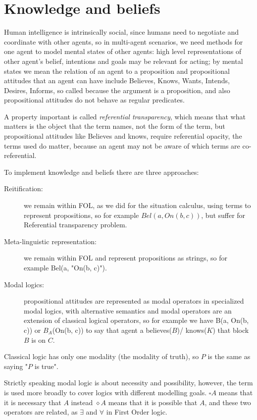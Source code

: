 \section{Knowledge and beliefs}
Human intelligence is intrinsically social, since humans need to negotiate and
coordinate with other agents, so in multi-agent scenarios, we need methods for
one agent to model mental states of other agents: high level representations of
other agent’s belief, intentions and goals may be relevant for acting;
by mental states we mean the relation of an agent to a proposition and 
propositional attitudes that an agent can have include Believes, Knows, Wants,
Intends, Desires, Informs, so called because the argument is a proposition, and 
also propositional attitudes do not behave as regular predicates.

A property important is called \emph{referential transparency}, which means that 
what matters is the object that the term names, not the form of the term, but 
propositional attitudes like Believes and knows, require referential opacity, 
the terms used do matter, because an agent may not be aware
of which terms are co-referential.

To implement knowledge and beliefs there are three approaches:
\begin{description}
   \item [Reitification: ] we remain within FOL, as we did for the situation calculus,
	   using terms to represent propositions, so for example $Bel(a, On(b, c))$,
	   but suffer for Referential transparency problem.
   \item [Meta-linguistic representation: ] we remain within FOL and represent
	   propositions as strings, so for example Bel(a, "On(b, c)").
   \item [Modal logics: ] propositional attitudes are represented as modal operators
	   in specialized modal logics, with alternative semantics and modal operators
	   are an extension of classical logical operators, so for example we have
	   B(a, On(b, c)) or $B_A$(On(b, c)) to say that agent a believes($B$)/
	   knows($K$) that block $B$ is on $C$.
\end{description}
Classical logic has only one modality (the modality of truth), so $P$ is the same as 
saying "$P$ is true".

Strictly speaking modal logic is about necessity and possibility, however, the
term is used more broadly to cover logics with different modelling goals.
$\square A$ means that it is necessary that $A$ instead $\diamond A$ means that 
it is possible that $A$, and these two operators are related, as $\exists$ and $\forall$
in First Order logic.

